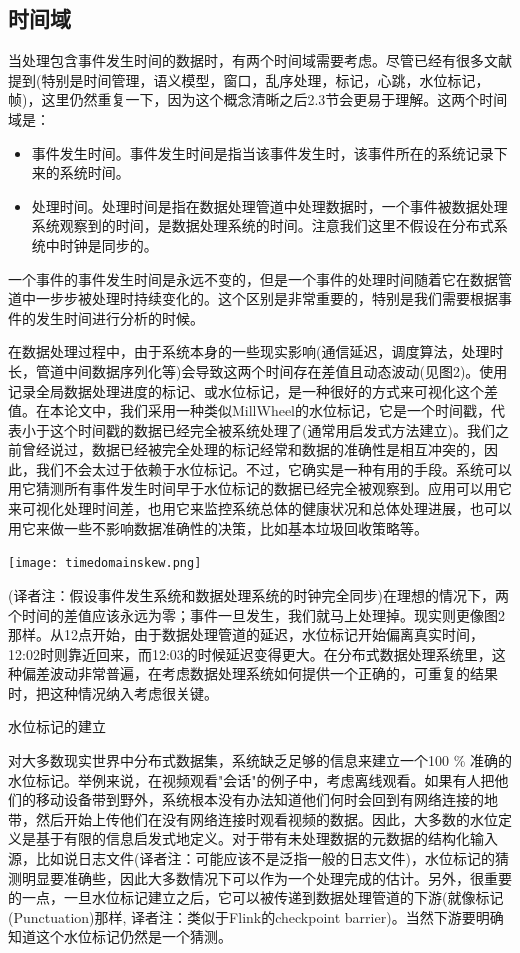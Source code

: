 \documentclass[oneside]{ctexbook}
\begin{document}
\subsection{时间域}

当处理包含事件发生时间的数据时，有两个时间域需要考虑。尽管已经有很多文献提到(特别是时间管理，语义模型，窗口，乱序处理，标记，心跳，水位标记，帧)，这里仍然重复一下，因为这个概念清晰之后2.3节会更易于理解。这两个时间域是：

\begin{itemize}
\item 事件发生时间。事件发生时间是指当该事件发生时，该事件所在的系统记录下来的系统时间。
\item 处理时间。处理时间是指在数据处理管道中处理数据时，一个事件被数据处理系统观察到的时间，是数据处理系统的时间。注意我们这里不假设在分布式系统中时钟是同步的。
\end{itemize}
一个事件的事件发生时间是永远不变的，但是一个事件的处理时间随着它在数据管道中一步步被处理时持续变化的。这个区别是非常重要的，特别是我们需要根据事件的发生时间进行分析的时候。

在数据处理过程中，由于系统本身的一些现实影响(通信延迟，调度算法，处理时长，管道中间数据序列化等)会导致这两个时间存在差值且动态波动(见图2)。使用记录全局数据处理进度的标记、或水位标记，是一种很好的方式来可视化这个差值。在本论文中，我们采用一种类似MillWheel的水位标记，它是一个时间戳，代表小于这个时间戳的数据已经完全被系统处理了(通常用启发式方法建立)。我们之前曾经说过，数据已经被完全处理的标记经常和数据的准确性是相互冲突的，因此，我们不会太过于依赖于水位标记。不过，它确实是一种有用的手段。系统可以用它猜测所有事件发生时间早于水位标记的数据已经完全被观察到。应用可以用它来可视化处理时间差，也用它来监控系统总体的健康状况和总体处理进展，也可以用它来做一些不影响数据准确性的决策，比如基本垃圾回收策略等。

\noindent \texttt{[image: timedomainskew.png]}

(译者注：假设事件发生系统和数据处理系统的时钟完全同步)在理想的情况下，两个时间的差值应该永远为零；事件一旦发生，我们就马上处理掉。现实则更像图2那样。从12点开始，由于数据处理管道的延迟，水位标记开始偏离真实时间，12:02时则靠近回来，而12:03的时候延迟变得更大。在分布式数据处理系统里，这种偏差波动非常普遍，在考虑数据处理系统如何提供一个正确的，可重复的结果时，把这种情况纳入考虑很关键。

水位标记的建立

对大多数现实世界中分布式数据集，系统缺乏足够的信息来建立一个100 \% 准确的水位标记。举例来说，在视频观看"会话"的例子中，考虑离线观看。如果有人把他们的移动设备带到野外，系统根本没有办法知道他们何时会回到有网络连接的地带，然后开始上传他们在没有网络连接时观看视频的数据。因此，大多数的水位定义是基于有限的信息启发式地定义。对于带有未处理数据的元数据的结构化输入源，比如说日志文件(译者注：可能应该不是泛指一般的日志文件)，水位标记的猜测明显要准确些，因此大多数情况下可以作为一个处理完成的估计。另外，很重要的一点，一旦水位标记建立之后，它可以被传递到数据处理管道的下游(就像标记(Punctuation)那样, 译者注：类似于Flink的checkpoint barrier)。当然下游要明确知道这个水位标记仍然是一个猜测。
\end{document}
